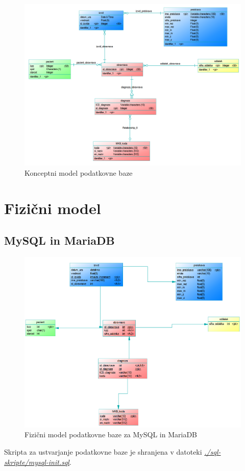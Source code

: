 \documentclass[a4paper,11pt]{report}
\begin{document}
\begin{figure}[htb]
    \noindent\includegraphics[width=\linewidth]{./pics/konceptni.png}
    \caption{Konceptni model podatkovne baze}
 \end{figure}

\section{Fizični model}
\subsection{MySQL in MariaDB}
\begin{figure}[htb]
   \noindent\includegraphics[width=\linewidth]{./pics/fizicni-mysql.png}
   \caption{Fizični model podatkovne baze za MySQL in MariaDB}
\end{figure}
Skripta za ustvarjanje podatkovne baze je shranjena v datoteki \textit{\underline{./sql-skripte/mysql-init.sql}}.
\pagebreak
\end{document}
